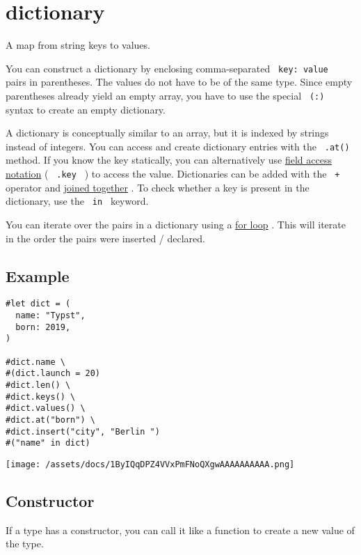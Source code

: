 \section{\texorpdfstring{{ dictionary }}{ dictionary }}\label{summary}

A map from string keys to values.

You can construct a dictionary by enclosing comma-separated
\texttt{\ key:\ value\ } pairs in parentheses. The values do not have to
be of the same type. Since empty parentheses already yield an empty
array, you have to use the special \texttt{\ (:)\ } syntax to create an
empty dictionary.

A dictionary is conceptually similar to an array, but it is indexed by
strings instead of integers. You can access and create dictionary
entries with the \texttt{\ .at()\ } method. If you know the key
statically, you can alternatively use
\href{/docs/reference/scripting/\#fields}{field access notation} (
\texttt{\ .key\ } ) to access the value. Dictionaries can be added with
the \texttt{\ +\ } operator and
\href{/docs/reference/scripting/\#blocks}{joined together} . To check
whether a key is present in the dictionary, use the \texttt{\ in\ }
keyword.

You can iterate over the pairs in a dictionary using a
\href{/docs/reference/scripting/\#loops}{for loop} . This will iterate
in the order the pairs were inserted / declared.

\subsection{Example}\label{example}

\begin{verbatim}
#let dict = (
  name: "Typst",
  born: 2019,
)

#dict.name \
#(dict.launch = 20)
#dict.len() \
#dict.keys() \
#dict.values() \
#dict.at("born") \
#dict.insert("city", "Berlin ")
#("name" in dict)
\end{verbatim}

\texttt{[image: /assets/docs/1ByIQqDPZ4VVxPmFNoQXgwAAAAAAAAAA.png]}

\subsection{\texorpdfstring{Constructor
{}}{Constructor }}\label{constructor}

\phantomsection\label{constructor-constructor-tooltip}
If a type has a constructor, you can call it like a function to create a
new value of the type.


